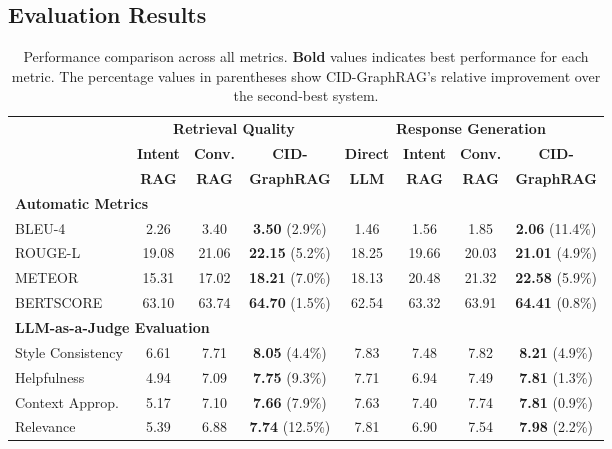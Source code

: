 \documentclass[
]{style/ceurart}
\begin{document}
\subsection {Evaluation Results}  
\begin{table}[t]
\centering
\caption{Performance comparison across all metrics. \textbf{Bold} values indicates best performance for each metric. The percentage values in parentheses show CID-GraphRAG's relative improvement over the second-best system.}
\begin{tabular}{@{}l@{\hspace{3pt}}@{\hspace{3pt}}ccc@{\hspace{3pt}}@{\hspace{3pt}}cccc@{}}
\toprule
\multirow{3}{*}{} & \multicolumn{3}{c}{\textbf{Retrieval Quality}} & \multicolumn{4}{c}{\textbf{Response Generation}} \\
\cmidrule(lr){2-4} \cmidrule(lr){5-8}
& \textbf{Intent} & \textbf{Conv.} & \textbf{CID-} & \textbf{Direct} & \textbf{Intent} & \textbf{Conv.} & \textbf{CID-} \\
& \textbf{RAG} & \textbf{RAG} & \textbf{GraphRAG} & \textbf{LLM} & \textbf{RAG} & \textbf{RAG} & \textbf{GraphRAG} \\
\midrule
\multicolumn{8}{l}{\textbf{Automatic Metrics}} \\
\midrule
BLEU-4 & 2.26 & 3.40 & \textbf{3.50} (2.9\%) & 1.46 & 1.56 & 1.85 & \textbf{2.06} (11.4\%) \\
ROUGE-L & 19.08 & 21.06 & \textbf{22.15} (5.2\%) & 18.25 & 19.66 & 20.03 & \textbf{21.01} (4.9\%) \\
METEOR & 15.31 & 17.02 & \textbf{18.21} (7.0\%) & 18.13 & 20.48 & 21.32 & \textbf{22.58} (5.9\%) \\
BERTSCORE & 63.10 & 63.74 & \textbf{64.70} (1.5\%) & 62.54 & 63.32 & 63.91 & \textbf{64.41} (0.8\%) \\
\midrule
\multicolumn{8}{l}{\textbf{LLM-as-a-Judge Evaluation}} \\
\midrule
Style Consistency & 6.61 & 7.71 & \textbf{8.05} (4.4\%) & 7.83 & 7.48 & 7.82 & \textbf{8.21} (4.9\%) \\
Helpfulness & 4.94 & 7.09 & \textbf{7.75} (9.3\%) & 7.71 & 6.94 & 7.49 & \textbf{7.81} (1.3\%) \\
Context Approp. & 5.17 & 7.10 & \textbf{7.66} (7.9\%) & 7.63 & 7.40 & 7.74 & \textbf{7.81} (0.9\%) \\
Relevance & 5.39 & 6.88 & \textbf{7.74} (12.5\%) & 7.81 & 6.90 & 7.54 & \textbf{7.98} (2.2\%) \\

\end{tabular}
\end{table}
\end{document}
